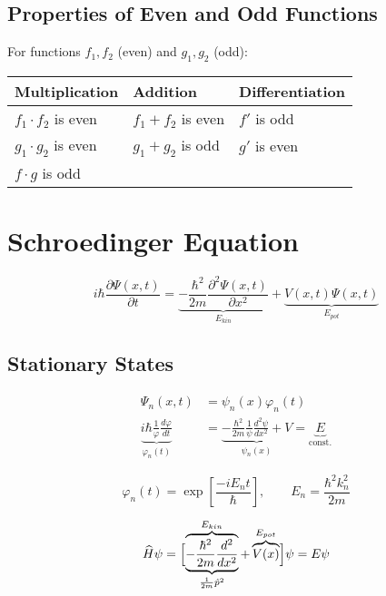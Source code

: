 \subsection{Properties of Even and Odd Functions}
For functions $f_1, f_2$ (even) and $g_1, g_2$ (odd):
\newpar{}
\begin{tabularx}{\linewidth}{@{}XXX@{}}
    Multiplication         & Addition          & Differentiation \\
    \midrule{}
    $f_1\cdot f_2$ is even & $f_1+f_2$ is even & $f'$ is odd     \\
    $g_1\cdot g_2$ is even & $g_1+g_2$ is odd  & $g'$ is even    \\
    $f\cdot g$ is odd      &                   &
\end{tabularx}


\newcol{}
\section{Schroedinger Equation}
\noindent\begin{equation*}
    i\hbar \frac{\partial \Psi(x,t)}{\partial t}           = \underbrace{- \frac{\hbar^2}{2m} \frac{\partial^2 \Psi(x,t)}{\partial x^2}}_{E_{kin}} + \underbrace{V(x,t)\Psi(x,t)}_{E_{pot}}
\end{equation*}

\subsection{Stationary States}
\noindent\begin{align*}
    \Psi_n(x,t)                                                        & = \psi_n(x)\varphi_n(t)                                                                                         \\
    \underbrace{i\hbar\frac1\varphi\frac{d\varphi}{dt}}_{\varphi_n(t)} & =\underbrace{-\frac{\hbar^2}{2m}\frac1\psi\frac{d^2\psi}{dx^2}+V}_{\psi_n (x)} = \underbrace{E}_{\text{const.}}
\end{align*}

\noindent\begin{equation*}
    \varphi_n(t) =\exp\left[\frac{-iE_n t}{\hbar}\right], \qquad E_n = \frac{\hbar^2 k_n^2}{2m}
\end{equation*}

\noindent\begin{equation*}
    \widehat{H}\psi  = \Bigl[\overbrace{\underbrace{-\frac{\hbar^2}{2m}\frac{d^2}{dx^2}}_{\frac{1}{2m}\hat{p}^2}}^{E_{kin}}+ \overbrace{V(x)}^{E_{pot}}\Bigr]\psi = E\psi
\end{equation*}

